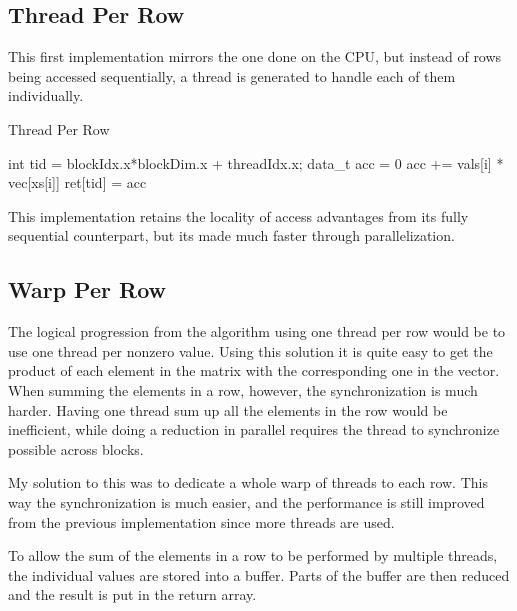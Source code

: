 \documentclass{article}
\begin{document}
\subsection{Thread Per Row}
This first implementation mirrors the one done on the CPU, but instead of rows being accessed sequentially, a thread is generated to handle each of them individually.
\begin{algorithm}[ht]
    \caption{Thread Per Row}
    int tid = blockIdx.x*blockDim.x + threadIdx.x;
     {
        data\_t acc = 0\;
         {
            acc += vals[i] * vec[xs[i]]\;
        }
        ret[tid] = acc\;
    }
\end{algorithm}
This implementation retains the locality of access advantages from its fully sequential counterpart, but its made much faster through parallelization.

\subsection{Warp Per Row}
The logical progression from the algorithm using one thread per row would be to use one thread per nonzero value. Using this solution it is quite easy to get the product of each element in the matrix with the corresponding one in the vector.\\
When summing the elements in a row, however, the synchronization is much harder. Having one thread sum up all the elements in the row would be inefficient, while doing a reduction in parallel requires the thread to synchronize possible across blocks.

My solution to this was to dedicate a whole warp of threads to each row. This way the synchronization is much easier, and the performance is still improved from the previous implementation since more threads are used.

To allow the sum of the elements in a row to be performed by multiple threads, the individual values are stored into a buffer. Parts of the buffer are then reduced and the result is put in the return array.
\end{document}
